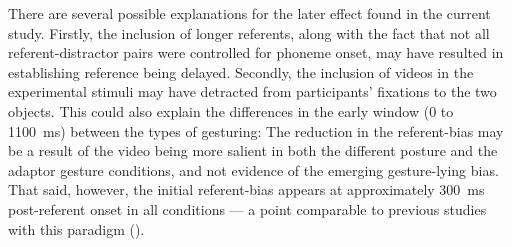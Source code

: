 \documentclass[a4paper,man,natbib]{apa6}
\begin{document}
There are several possible explanations for the later effect found in the current study.
Firstly, the inclusion of longer referents, along with the fact that not all referent-distractor pairs were controlled for phoneme onset, may have resulted in establishing reference being delayed. 
Secondly, the inclusion of videos in the experimental stimuli may have detracted from participants' fixations to the two objects.
This could also explain the differences in the early window (0 to 1100~ms) between the types of gesturing: The reduction in the referent-bias may be a result of the video being more salient in both the different posture and the adaptor gesture conditions, and not evidence of the emerging gesture-lying bias. 
That said, however, the initial referent-bias appears at approximately 300~ms post-referent onset in all conditions --- a point comparable to previous studies with this paradigm (\citealt{Loy2017, King2018}).
\end{document}
